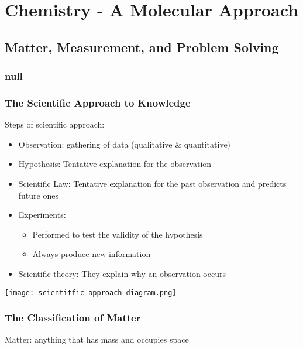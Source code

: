 \documentclass[openany]{book}
\begin{document}
\frontmatter
\tableofcontents
\clearpage

\mainmatter

\raggedright

\part{Chemistry - A Molecular Approach}

\chapter{Matter, Measurement, and Problem Solving}

\section{null}

\section{The Scientific Approach to Knowledge}

Steps of scientific approach:
\begin{itemize}
	\item Observation: gathering of data (qualitative \& quantitative)
	\item Hypothesis: Tentative explanation for the observation
	\item Scientific Law: Tentative explanation for the past observation and predicts future ones
	\item Experiments:
	      \begin{itemize}
		      \item Performed to test the validity of the hypothesis
		      \item Always produce new information
	      \end{itemize}
	\item Scientific theory: They explain why an observation occurs
\end{itemize}

\texttt{[image: scientitfic-approach-diagram.png]}

\section{The Classification of Matter}

Matter: anything that has mass and occupies space
\end{document}
